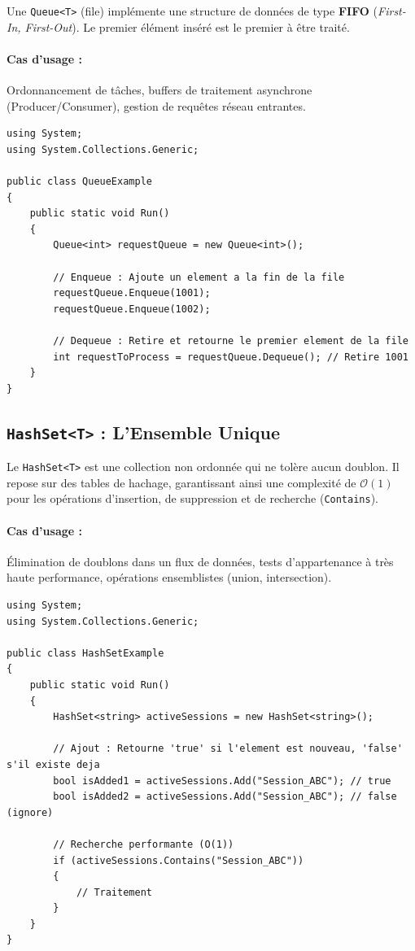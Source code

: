 Une \texttt{Queue<T>} (file) implémente une structure de données de type \textbf{FIFO} (\textit{First-In, First-Out}). Le premier élément inséré est le premier à être traité.

\paragraph{Cas d'usage :} Ordonnancement de tâches, buffers de traitement asynchrone (Producer/Consumer), gestion de requêtes réseau entrantes.

\begin{lstlisting}[language={[Sharp]C}]
using System;
using System.Collections.Generic;

public class QueueExample
{
    public static void Run()
    {
        Queue<int> requestQueue = new Queue<int>();
        
        // Enqueue : Ajoute un element a la fin de la file
        requestQueue.Enqueue(1001);
        requestQueue.Enqueue(1002);
        
        // Dequeue : Retire et retourne le premier element de la file
        int requestToProcess = requestQueue.Dequeue(); // Retire 1001
    }
}
\end{lstlisting}

\subsection{\texttt{HashSet<T>} : L'Ensemble Unique}

Le \texttt{HashSet<T>} est une collection non ordonnée qui ne tolère aucun doublon. Il repose sur des tables de hachage, garantissant ainsi une complexité de $\mathcal{O}(1)$ pour les opérations d'insertion, de suppression et de recherche (\texttt{Contains}).

\paragraph{Cas d'usage :} Élimination de doublons dans un flux de données, tests d'appartenance à très haute performance, opérations ensemblistes (union, intersection).

\begin{lstlisting}[language={[Sharp]C}]
using System;
using System.Collections.Generic;

public class HashSetExample
{
    public static void Run()
    {
        HashSet<string> activeSessions = new HashSet<string>();
        
        // Ajout : Retourne 'true' si l'element est nouveau, 'false' s'il existe deja
        bool isAdded1 = activeSessions.Add("Session_ABC"); // true
        bool isAdded2 = activeSessions.Add("Session_ABC"); // false (ignore)
        
        // Recherche performante (O(1))
        if (activeSessions.Contains("Session_ABC"))
        {
            // Traitement
        }
    }
}
\end{lstlisting}


